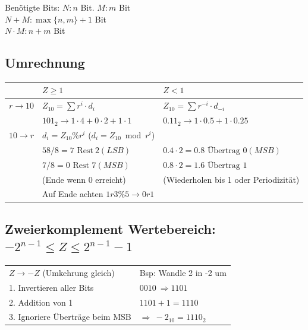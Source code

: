 \documentclass[6pt,a4paper]{scrartcl}
\newcommand{\ra}[0]{\ensuremath{\rightarrow}} 									%
\begin{document}
\begin{multicols*}{3}
Benötigte Bits: $N: n$ Bit.  $M: m$ Bit \\
$N + M: \max\{n,m\}+1$ Bit \\
$N \cdot M: n+m$ Bit
	\subsection{Umrechnung}
	\begin{tabular}{l|l|l}
			& $Z \ge 1$ & $Z < 1$\\ \midrule
		$r \rightarrow 10$ & $Z_{10} = \sum r^i \cdot d_i$ & $Z_{10} = \sum r^{-i} \cdot d_{-i}$\\
		& $101_2 \ra 1 \cdot 4 + 0\cdot 2 + 1 \cdot 1$ & $0.11_2 \ra 1\cdot 0.5 + 1\cdot 0.25$\\ \midrule
		$10 \rightarrow r$ & $d_i = Z_{10} \% r^i$ ($d_i=Z_{10}\bmod r^i$) & \\
		& $58 / 8 = 7\text{ Rest}\ 2 (LSB)$ & $0.4 \cdot 2 = 0.8 \text{ Übertrag } 0 (MSB)$\\
		& $7 / 8 = 0\text{ Rest } 7 (MSB)$ & $0.8 \cdot 2 = 1.6 \text{ Übertrag } 1$ \\
		& (Ende wenn 0 erreicht) & (Wiederholen bis 1 oder Periodizität)\\
		& Auf Ende achten $1r3\%5\rightarrow 0r1$
	\end{tabular}

	\subsection{Zweierkomplement \qquad Wertebereich: $-2^{n-1} \le Z \le 2^{n-1} -1$}
		\begin{tabular}{l|l}
			\textbf{$Z \rightarrow -Z$} (Umkehrung gleich) & Bsp: Wandle 2 in -2 um\\
			1. Invertieren aller Bits  & $0010 \ \Rightarrow 1101$\\
			2. Addition von 1	& $1101 + 1 = 1110$\\
			3. Ignoriere Überträge beim MSB & $\Rightarrow \ -2_{10} = 1110_2$\\
		\end{tabular}

\end{multicols*}
\end{document}

